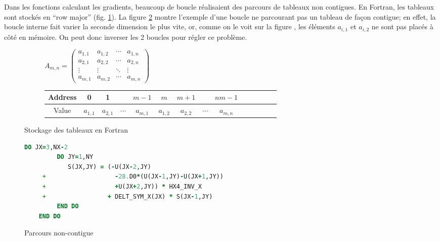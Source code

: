 Dans les fonctions calculant les gradients, beaucoup de boucle réalisaient des parcours de tableaux non contigues. En Fortran, les tableaux sont stockés en ``row major'' (fig. \ref{fig:rowmajor}). La figure \ref{fig:noncontiguous} montre l'exemple d'une boucle ne parcourant pas un tableau de façon contigue; en effet, la boucle interne fait varier la seconde dimension le plus vite, or, comme on le voit sur la figure , les éléments $a_{i,1}$ et $a_{i,2}$ ne sont pas placés à côté en mémoire. On peut donc inverser les 2 boucles pour régler ce problème.

\begin{figure}[ht]
  \centering
  \begin{subfigure}[b]{1\textwidth}
    \centering
    $A_{m,n} = 
    \begin{pmatrix}
      a_{1,1} & a_{1,2} & \cdots & a_{1,n} \\
      a_{2,1} & a_{2,2} & \cdots & a_{2,n} \\
      \vdots  & \vdots  & \ddots & \vdots  \\
      a_{m,1} & a_{m,2} & \cdots & a_{m,n} 
    \end{pmatrix}
    $
  \end{subfigure}
  \vspace{0.6cm}
  
  \begin{subfigure}[b]{1\textwidth}
    \centering
    \begin{tabular}{|c|c|c|c|c|c|c|c|c|c|c|c|c|c|}
      \hline
      Address & 0 & 1  & & $m-1$ & $m$ & $m+1$ &  & $nm-1$ \\
      \hline
      Value & $a_{1,1}$ & $a_{2,1}$ & $\cdots$ & $a_{m,1}$ & $a_{1,2}$ & $a_{2,2}$ & $\cdots$ & $a_{m,n}$ \\
      \hline
      \end{tabular}
  \end{subfigure}
  \caption{\label{fig:rowmajor}Stockage des tableaux en Fortran}
\end{figure}

\begin{figure}[!ht]
  \centering
  \begin{lstlisting}[language=Fortran]
    DO JX=3,NX-2
         DO JY=1,NY
            S(JX,JY) = (-U(JX-2,JY)
     +                   -28.D0*(U(JX-1,JY)-U(JX+1,JY))
     +                   +U(JX+2,JY)) * HX4_INV_X 
     +                 + DELT_SYM_X(JX) * S(JX-1,JY)
         END DO
    END DO
  \end{lstlisting}
  \caption{\label{fig:noncontiguous}Parcours non-contigue}
\end{figure}



